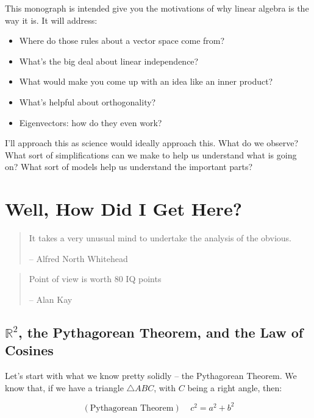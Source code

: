 \documentclass[
]{book}
\providecommand{\tightlist}{%
  \setlength{\itemsep}{0pt}\setlength{\parskip}{0pt}}
\begin{document}
This monograph is intended give you the motivations of why linear algebra is the way it is. It will address:

\begin{itemize}
\tightlist
\item
  Where do those rules about a vector space come from?
\item
  What's the big deal about linear independence?
\item
  What would make you come up with an idea like an inner product?
\item
  What's helpful about orthogonality?
\item
  Eigenvectors: how do they even work?
\end{itemize}

I'll approach this as science would ideally approach this. What do we observe? What sort of simplifications can we make to help us understand what is going on? What sort of models help us understand the important parts?

\hypertarget{well-how-did-i-get-here}{%
\chapter{Well, How Did I Get Here?}\label{well-how-did-i-get-here}}

\begin{quote}
It takes a very unusual mind to undertake the analysis of the obvious.

-- Alfred North Whitehead
\end{quote}

\begin{quote}
Point of view is worth 80 IQ points

-- Alan Kay
\end{quote}

\hypertarget{mathbbr2-the-pythagorean-theorem-and-the-law-of-cosines}{%
\section{\texorpdfstring{\(\mathbb{R}^2\), the Pythagorean Theorem, and the Law of Cosines}{\textbackslash mathbb\{R\}\^{}2, the Pythagorean Theorem, and the Law of Cosines}}\label{mathbbr2-the-pythagorean-theorem-and-the-law-of-cosines}}

Let's start with what we know pretty solidly -- the Pythagorean Theorem. We know that, if we have a triangle \(\triangle ABC\), with \(C\) being a right angle, then:

\[(\text{Pythagorean Theorem}) \ \ \ \ \ c^2 = a^2 + b^2\]
\end{document}
